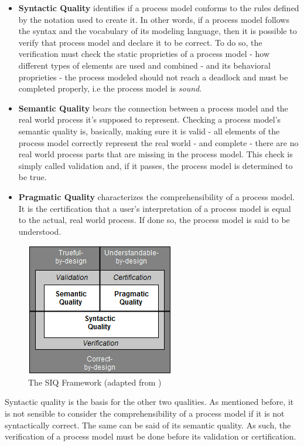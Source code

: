 \documentclass[a4paper,twoside]{article}
\begin{document}
\begin{itemize}
	\item \textbf{Syntactic Quality} identifies if a process model conforms to the rules defined by the notation used to create it. In other words, if a process model follows the syntax and the vocabulary of its modeling language, then it is possible to verify that process model and declare it to be correct. To do so, the verification must check the static proprieties of a process model - how different types of elements are used and combined - and its behavioral proprieties - the process modeled should not reach a deadlock and must be completed properly, i.e the process model is \textit{sound}.
	\item \textbf{Semantic Quality} bears the connection between a process model and the real world process it's supposed to represent. Checking a process model's semantic quality is, basically, making sure it is valid - all elements of the process model correctly represent the real world - and complete - there are no real world process parts that are missing in the process model. This check is simply called validation and, if it passes, the process model is determined to be true.
	\item \textbf{Pragmatic Quality} characterizes the comprehensibility of a process model. It is the certification that a user's interpretation of a process model is equal to the actual, real world process. If done so, the process model is said to be understood.
\end{itemize}


\begin{figure}
	\centering
	\includegraphics[scale=0.8]{SIQFramework.png}
	\caption{The SIQ Framework (adapted from \cite{Reijers2015})}
	\label{SIQFigure}
\end{figure}

Syntactic quality is the basis for the other two qualities. As mentioned before, it is not sensible to consider the comprehensibility of a process model if it is not syntactically correct. The same can be said of its semantic quality. As such, the verification of a process model must be done before its validation or certification.
\end{document}
